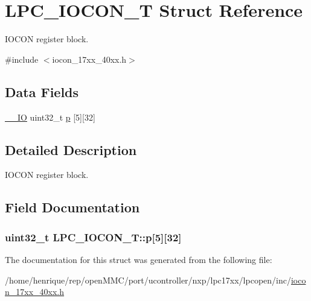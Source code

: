 \hypertarget{structLPC__IOCON__T}{\section{L\-P\-C\-\_\-\-I\-O\-C\-O\-N\-\_\-\-T Struct Reference}
\label{structLPC__IOCON__T}
}


I\-O\-C\-O\-N register block.  




{\ttfamily \#include $<$iocon\-\_\-17xx\-\_\-40xx.\-h$>$}

\subsection*{Data Fields}
\begin{DoxyCompactItemize}
\item 
\hyperlink{core__cm3_8h_aec43007d9998a0a0e01faede4133d6be}{\-\_\-\-\_\-\-I\-O} uint32\-\_\-t \hyperlink{structLPC__IOCON__T_aea0d3512ec47df7ef7573774e36349c8}{p} \mbox{[}5\mbox{]}\mbox{[}32\mbox{]}
\end{DoxyCompactItemize}


\subsection{Detailed Description}
I\-O\-C\-O\-N register block. 

\subsection{Field Documentation}
\hypertarget{structLPC__IOCON__T_aea0d3512ec47df7ef7573774e36349c8}{
\subsubsection[{p}]{ uint32\-\_\-t L\-P\-C\-\_\-\-I\-O\-C\-O\-N\-\_\-\-T\-::p\mbox{[}5\mbox{]}\mbox{[}32\mbox{]}}}\label{structLPC__IOCON__T_aea0d3512ec47df7ef7573774e36349c8}


The documentation for this struct was generated from the following file\-:\begin{DoxyCompactItemize}
\item 
/home/henrique/rep/open\-M\-M\-C/port/ucontroller/nxp/lpc17xx/lpcopen/inc/\hyperlink{iocon__17xx__40xx_8h}{iocon\-\_\-17xx\-\_\-40xx.\-h}\end{DoxyCompactItemize}
